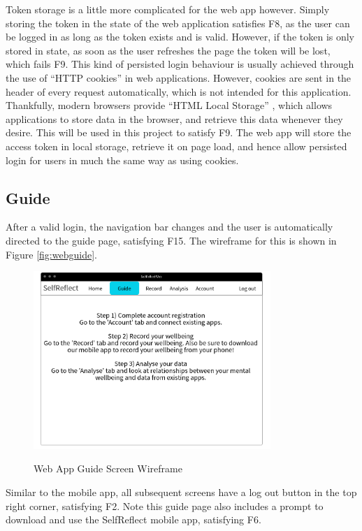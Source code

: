 \documentclass[11pt,openright,a4paper]{report}
\begin{document}
Token storage is a little more complicated for the web app however. Simply storing the token in the state of the web application satisfies F8, as the user can be logged in as long as the token exists and is valid. However, if the token is only stored in state, as soon as the user refreshes the page the token will be lost, which fails F9. This kind of persisted login behaviour is usually achieved through the use of \enquote{HTTP cookies} in web applications. However, cookies are sent in the header of every request automatically, which is not intended for this application. Thankfully, modern browsers provide \enquote{HTML Local Storage} \parencite{htmllocalstorage}, which allows applications to store data in the browser, and retrieve this data whenever they desire. This will be used in this project to satisfy F9. The web app will store the access token in local storage, retrieve it on page load, and hence allow persisted login for users in much the same way as using cookies.

\subsection{Guide}
After a valid login, the navigation bar changes and the user is automatically directed to the guide page, satisfying F15. The wireframe for this is shown in Figure \ref{fig:webguide}.

\begin{figure}[ht]
\centering
\caption{Web App Guide Screen Wireframe}
\includegraphics[width=0.8\textwidth]{i/webguide.png}
\label{fig:webgude}
\end{figure}

Similar to the mobile app, all subsequent screens have a log out button in the top right corner, satisfying F2. Note this guide page also includes a prompt to download and use the SelfReflect mobile app, satisfying F6.
\end{document}
